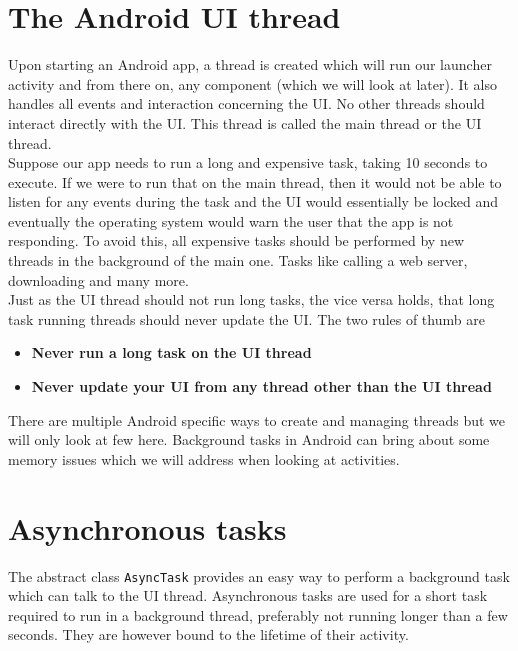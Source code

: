 \section{The Android UI thread}
Upon starting an Android app, a thread is created which will run our launcher activity and from there on, any component (which we will look at later). It also handles all events and interaction concerning the UI. No other threads should interact directly with the UI. This thread is called the main thread or the UI thread.\\

Suppose our app needs to run a long and expensive task, taking 10 seconds to execute. If we were to run that on the main thread, then it would not be able to listen for any events during the task and the UI would essentially be locked and eventually the operating system would warn the user that the app is not responding. To avoid this, all expensive tasks should be performed by new threads in the background of the main one. Tasks like calling a web server, downloading and many more.\\

Just as the UI thread should not run long tasks, the vice versa holds, that long task running threads should never update the UI. The two rules of thumb are
\begin{itemize}
\item \textbf{Never run a long task on the UI thread}
\item \textbf{Never update your UI from any thread other than the UI thread}
\end{itemize}

There are multiple Android specific ways to create and managing threads but we will only look at few here. Background tasks in Android can bring about some memory issues which we will address when looking at activities.

\section{Asynchronous tasks}
The abstract class \texttt{AsyncTask} provides an easy way to perform a background task which can talk to the UI thread. Asynchronous tasks are used for a short task required to run in a background thread, preferably not running longer than a few seconds. They are however bound to the lifetime of their activity.\\

